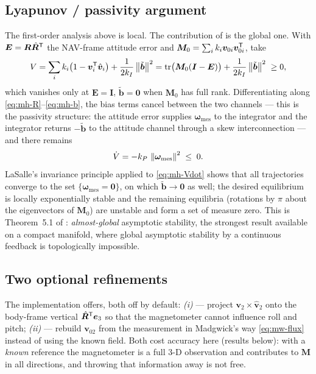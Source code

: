 \subsection{Lyapunov / passivity argument}
The first-order analysis above is local. The contribution of \cite{mahony2008} is the global one.
With $\bm{E}=\bm{R}\hat{\bm{R}}^{\mathsf{T}}$ the NAV-frame attitude error and
$\bm{M}_0=\sum_i k_i\bm{v}_{0i}\bm{v}_{0i}^{\mathsf{T}}$, take
\begin{equation}
V = \sum_i k_i\big(1-\bm{v}_i^{\mathsf{T}}\hat{\bm{v}}_i\big) + \frac{1}{2k_I}\left\lVert \tilde{\bm{b}} \right\rVert^2
  = \operatorname{tr}\!\big(\bm{M}_0(\bm{I}-\bm{E})\big) + \frac{1}{2k_I}\left\lVert \tilde{\bm{b}} \right\rVert^2 \;\ge 0 ,
\label{eq:mh-V}
\end{equation}
which vanishes only at $\bm{E}=\bm{I}$, $\tilde{\bm{b}}=\bm{0}$ when $\bm{M}_0$ has full rank.
Differentiating along \eqref{eq:mh-R}--\eqref{eq:mh-b}, the bias terms cancel between the two
channels --- this is the passivity structure: the attitude error supplies
$\bm{\omega}_{\text{mes}}$ to the integrator and the integrator returns $-\tilde{\bm{b}}$ to the
attitude channel through a skew interconnection --- and there remains
\begin{equation}
\dot V = -k_P\,\left\lVert \bm{\omega}_{\text{mes}} \right\rVert^2 \;\le\;0 .
\label{eq:mh-Vdot}
\end{equation}
LaSalle's invariance principle applied to \eqref{eq:mh-Vdot} shows that all trajectories converge to
the set $\{\bm{\omega}_{\text{mes}}=\bm{0}\}$, on which $\tilde{\bm{b}}\to\bm{0}$ as well; the
desired equilibrium is locally exponentially stable and the remaining equilibria (rotations by
$\pi$ about the eigenvectors of $\bm{M}_0$) are unstable and form a set of measure zero. This is
Theorem~5.1 of \cite{mahony2008}: \emph{almost-global} asymptotic stability, the strongest result
available on a compact manifold, where global asymptotic stability by a continuous feedback is
topologically impossible.

\subsection{Two optional refinements}
The implementation offers, both off by default:
\emph{(i)}  --- project $\bm{v}_2\times\hat{\bm{v}}_2$ onto the body-frame
vertical $\hat{\bm{R}}^{\mathsf{T}}\bm{e}_3$ so that the magnetometer cannot influence roll and pitch;
\emph{(ii)}  --- rebuild $\bm{v}_{02}$ from the measurement in Madgwick's
way \eqref{eq:mw-flux} instead of using the known field. Both cost accuracy here (results below):
with a \emph{known} reference the magnetometer is a full 3-D observation and contributes to $\bm{M}$
in all directions, and throwing that information away is not free.

